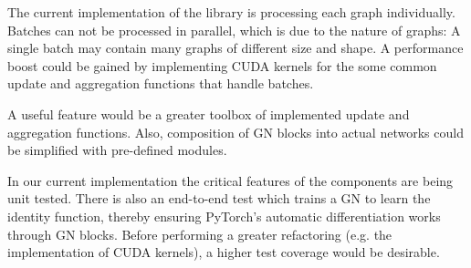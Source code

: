 The current implementation of the library is processing each graph individually. Batches can not be processed in parallel, which is due to the nature of graphs: A single batch may contain many graphs of different size and shape. A performance boost could be gained by implementing CUDA kernels for the some common update and aggregation functions that handle batches.

A useful feature would be a greater toolbox of implemented update and aggregation functions. Also, composition of GN blocks into actual networks could be simplified with pre-defined modules.

In our current implementation the critical features of the components are being unit tested. There is also an end-to-end test which trains a GN to learn the identity function, thereby ensuring PyTorch's automatic differentiation works through GN blocks. Before performing a greater refactoring (e.g. the implementation of CUDA kernels), a higher test coverage would be desirable.
